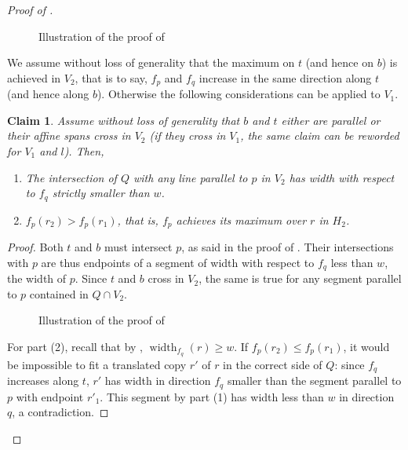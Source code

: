 \documentclass{amsart}
\theoremstyle{plain}
\newtheorem{claim}[theorem]{Claim}
\theoremstyle{definition}
\newcommand{\width}{\operatorname{width}}
\begin{document}
\begin{proof}[Proof of ]
\begin{figure}[htb]
\scalebox{.75}{}
\caption{Illustration of the proof of }
\label{fig:claim2}
\end{figure}

We assume without loss of generality that the maximum on $t$ (and hence on $b$) is achieved in $V_2$, that is to say, $f_p$ and $f_q$ increase in the same direction along $t$ (and hence along $b$). Otherwise the following considerations can be applied to $V_1$. 

\begin{claim}
\label{claim:r}
Assume without loss of generality that $b$ and $t$ either are parallel or their affine spans cross in $V_2$ (if they cross in $V_1$, the same claim can be reworded for $V_1$ and $l$). Then, 
\begin{enumerate}
\item The intersection of $Q$ with any line parallel to $p$ in $V_2$ has width with respect to $f_q$ strictly smaller than $w$.
\item $f_p(r_2) > f_p(r_1)$, that is, $f_p$ achieves its maximum over $r$ in $H_2$.
\end{enumerate}
\end{claim}

\begin{proof}
Both $t$ and $b$ must intersect $p$, as said in the proof of .  Their intersections with $p$ are thus endpoints of a segment of width with respect to $f_q$ less than $w$, the width of $p$. Since $t$ and $b$ cross in $V_2$, the same is true for any segment parallel to $p$ contained in $Q \cap V_2$.  

\begin{figure}[htb]
\scalebox{.75}{}
\caption{Illustration of the proof of }
\label{fig:claim3}
\end{figure}

For part (2), recall that by , $\width_{f_q}(r) \geq w$. If $f_p(r_2) \leq f_p(r_1)$, it would be impossible to fit a translated copy $r'$ of $r$ in the correct side of $Q$: since $f_q$ increases along $t$, $r'$ has width in direction $f_q$ smaller than the segment parallel to $p$ with endpoint $r'_1$. This segment by part (1) has width less than $w$ in direction $q$, a contradiction. 

\end{proof}


\end{proof}
\end{document}
